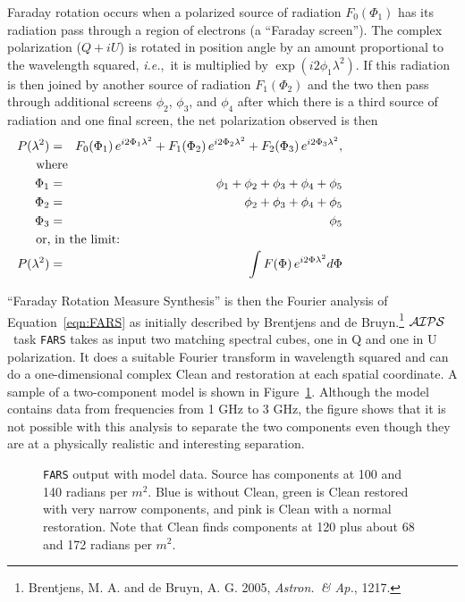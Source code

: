 \documentclass[twoside]{article}
\newcommand{\AIPS}{{$\cal AIPS\/$}}
\newcommand{\ie}{{\it i.e.},}
\newcommand{\putfig}[1]{\texttt{[image: \#1.eps]}}
\begin{document}
Faraday rotation occurs when a polarized source of radiation
$F_0(\Phi_1)$ has its radiation pass through a region of electrons (a
``Faraday screen'').  The complex polarization ($Q + iU$) is rotated
in position angle by an amount proportional to the wavelength squared,
\ie\ it is multiplied by $\exp (i 2 \phi_1 \lambda^2)$.  If this
radiation is then joined by another source of radiation $F_1(\Phi_2)$
and the two then pass through additional screens $\phi_2$, $\phi_3$,
and $\phi_4$ after which there is a third source of radiation and one
final screen, the net polarization observed  is then
\begin{eqnarray}
P(\lambda^2) & = & F_0(\Phi_1)\, e^{i2\Phi_1\lambda^2} + F_1(\Phi_2)\,
                   e^{i2\Phi_2\lambda^2} + F_2(\Phi_3)\,
                   e^{i2\Phi_3\lambda^2},\\
\noalign{\mbox{where}}
\Phi_1 & = & \phi_1 + \phi_2 + \phi_3 + \phi_4 + \phi_5 \nonumber\\
\Phi_2 & = & \phi_2 + \phi_3 + \phi_4 + \phi_5 \nonumber\\
\Phi_3 & = & \phi_5\nonumber\\
\noalign{\mbox{or, in the limit:}}
P(\lambda^2) & = & \int F(\Phi)\, e^{i2\Phi\lambda^2} d\Phi \label{eqn:FARS}
\end{eqnarray}

``Faraday Rotation Measure Synthesis'' is then the Fourier analysis of
Equation~\ref{eqn:FARS} as initially described by Brentjens and de
Bruyn.\footnote{Brentjens, M. A. and de Bruyn, A. G. 2005, {\it
    Astron.\ \& Ap.}, 1217.}  \AIPS\ task {\tt FARS} takes as input
two matching spectral cubes, one in Q and one in U polarization.  It
does a suitable Fourier transform in wavelength squared and can do a
one-dimensional complex Clean and restoration at each spatial
coordinate.  A sample of a two-component model is shown in
Figure~\ref{fig:FARS model}.  Although the model contains data from
frequencies from 1 GHz to 3 GHz, the figure shows that it is not
possible with this analysis to separate the two components even though
they are at a physically realistic and interesting separation.

\begin{figure}
\begin{center}
\resizebox{6.0in}{!}{\putfig{FARS}}
\caption{{\tt FARS} output with model data.  Source has components at
100 and 140 radians per $m^2$.  Blue is without Clean, green is Clean
restored with very narrow components, and pink is Clean with a normal
restoration.  Note that Clean finds components at 120 plus about 68
and 172 radians per $m^2$.}
\label{fig:FARS model}
\end{center}
\end{figure}
\end{document}
